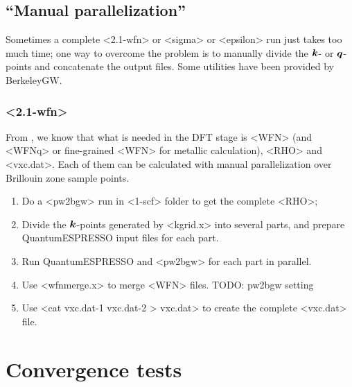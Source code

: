 \documentclass[hyperref, a4paper, 12pt]{report}
\def\texttt#1{<#1>}%
\newcommand{\shortcode}[1]{\texttt{#1}}
\begin{document}
\subsection{``Manual parallelization''}

Sometimes a complete \shortcode{2.1-wfn} or \shortcode{sigma} or \shortcode{epsilon} run 
just takes too much time;
one way to overcome the problem is to 
manually divide the $\vb*{k}$- or $\vb*{q}$-points 
and concatenate the output files.
Some utilities have been provided by BerkeleyGW.

\subsubsection{\shortcode{2.1-wfn}}

From , 
we know that what is needed in the DFT stage 
is \shortcode{WFN} (and \shortcode{WFNq} or fine-grained \shortcode{WFN} for metallic calculation),
\shortcode{RHO} and \shortcode{vxc.dat}.
Each of them can be calculated 
with manual parallelization over Brillouin zone sample points.

\begin{enumerate}
    \item Do a \shortcode{pw2bgw} run in \shortcode{1-scf} folder to get the complete \shortcode{RHO};
    \item Divide the $\vb*{k}$-points generated by \shortcode{kgrid.x} 
    into several parts,
    and prepare QuantumESPRESSO input files for each part.
    \item Run QuantumESPRESSO and \shortcode{pw2bgw} for each part in parallel.
    \item Use \shortcode{wfnmerge.x} to merge \shortcode{WFN} files. TODO: pw2bgw setting
    \item Use \shortcode{cat vxc.dat-1 vxc.dat-2 > vxc.dat} to create the complete \shortcode{vxc.dat} file.
\end{enumerate}

\section{Convergence tests}
\end{document}
